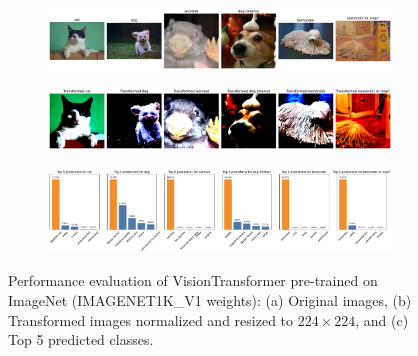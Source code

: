 \begin{figure}[H]
    \centering
    \begin{subfigure}{0.95\textwidth}
        \includegraphics[width=\textwidth]{original_images_vit}
        \caption{}
        \label{subfig:original_images_vit}
    \end{subfigure}
    \begin{subfigure}{0.95\textwidth}
        \includegraphics[width=\textwidth]{transformed_images_vit}
        \caption{}
        \label{subfig:transformed_images_vit}
    \end{subfigure}
    \begin{subfigure}{0.95\textwidth}
        \includegraphics[width=\textwidth]{prediction_plots_vit}
        \caption{}
        \label{subfig:prediction_plots_vit}
    \end{subfigure}
    \caption{Performance evaluation of VisionTransformer pre-trained on ImageNet (IMAGENET1K\_V1 weights): (a) Original images, (b) Transformed images normalized and resized to $224 \times 224$, and (c) Top 5 predicted classes.}
    \label{fig:vit_scratch}
\end{figure}

